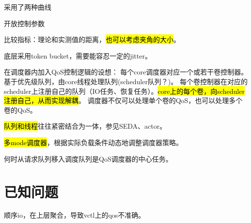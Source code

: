 采用了两种曲线

开放控制参数

比较指标：理论和实测值的距离，\hl{也可以考虑夹角的大小}。

底层采用token bucket，需要能容忍一定的jitter。

在调度器内加入QoS控制逻辑的设想： 每个core调度器对应一个或若干卷控制器。基于优先级队列，由core线程处理队列(scheduler队列？)。
每个卷控制器在对应的scheduler上注册自己的队列（IO任务、恢复任务）。\hl{core上的每个卷，向scheduler注册自己，从而实现解耦}。
调度器不仅可以处理单个卷的QoS，也可以处理多个卷的QoS。

\hl{队列和线程}往往紧密结合为一体，参见SEDA、actor。

\hl{多mode调度器}，根据实际负载条件动态地调整调度器策略。

何时从请求队列移入调度队列是QoS调度器的中心任务。

\section{已知问题}

顺序io，在上层聚合，导致vctl上的qos不准确。

